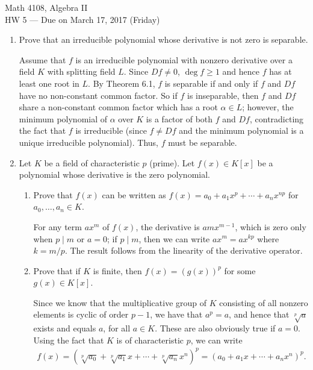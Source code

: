 \documentclass[12pt]{article}
\begin{document}
\begin{center}
{
Math 4108, Algebra II \\
HW 5 --- Due on March 17, 2017 (Friday)
}
\end{center}

\begin{enumerate}
    \item Prove that an irreducible polynomial whose derivative is not zero is separable. \par
        Assume that $f$ is an irreducible polynomial with nonzero derivative over a field $K$ with splitting field $L$. Since $Df \neq 0$, $\deg f \geq 1$ and hence $f$ has at least one root in $L$. By Theorem 6.1, $f$ is separable if and only if $f$ and $Df$ have no non-constant common factor. So if $f$ is inseparable, then $f$ and $Df$ share a non-constant common factor which has a root $\alpha \in L$; however, the minimum polynomial of $\alpha$ over $K$ is a factor of both $f$ and $Df$, contradicting the fact that $f$ is irreducible (since $f \neq Df$ and the minimum polynomial is a unique irreducible polynomial). Thus, $f$ must be separable.

    \item Let $K$ be a field of characteristic $p$ (prime).  Let $f(x) \in K[x]$ be a polynomial whose derivative is the zero polynomial. \par
    \begin{enumerate}
        \item Prove that $f(x)$ can be written as $f(x) = a_0 + a_1 x^p + \cdots + a_n x^{np}$ for $a_0,\dots,a_n \in K$. \par
            For any term $a x^m$ of $f(x)$, the derivative is $amx^{m - 1}$, which is zero only when $p \mid m$ or $a = 0$; if $p \mid m$, then we can write $ax^m = ax^{kp}$ where $k = m/p$. The result follows from the linearity of the derivative operator.
        \item Prove that if $K$ is finite, then $f(x) = (g(x))^p$ for some $g(x) \in K[x]$. \par
            Since we know that the multiplicative group of $K$ consisting of all nonzero elements is cyclic of order $p - 1$, we have that $a^p = a$, and hence that $\sqrt[p]{a}$ exists and equals $a$, for all $a \in K$. These are also obviously true if $a = 0$. Using the fact that $K$ is of characteristic $p$, we can write
            \begin{align*}
                f(x) = (\sqrt[p]{a_0} + \sqrt[p]{a_1} x + \cdots + \sqrt[p]{a_n} x^n)^p = (a_0 + a_1 x + \cdots + a_n x^n)^p.
            \end{align*}
    \end{enumerate}


\end{enumerate}
\end{document}
